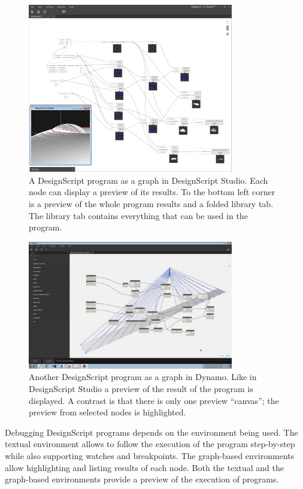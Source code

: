 \documentclass{./llncs2e/llncs}
\begin{document}
	\begin{figure}
		\centering
		\includegraphics[width=0.8\textwidth]{img/ds_dsstudio}
		\caption{A DesignScript program as a graph in DesignScript Studio. Each node can display a preview of its results. To the bottom left corner is a preview of the whole program results and a folded library tab. The library tab contains everything that can be used in the program.}
		\label{fig:ds:dsstudio}
	\end{figure} 
	
	\begin{figure}
		\centering
		\includegraphics[width=0.8\textwidth]{img/ds_dynamo}
		\caption{Another DesignScript program as a graph in Dynamo. Like in DesignScript Studio a preview of the result of the program is displayed. A contrast is that there is only one preview ``canvas''; the preview from selected nodes is highlighted.}
		\label{fig:ds:dynamo}
	\end{figure} 
	
	Debugging DesignScript programs depends on the environment being used. 
	The textual environment allows to follow the execution of the program step-by-step while also supporting watches and breakpoints. 
	The graph-based environments allow highlighting and listing results of each node. 
	Both the textual and the graph-based environments provide a preview of the execution of programs.
	
\end{document}
